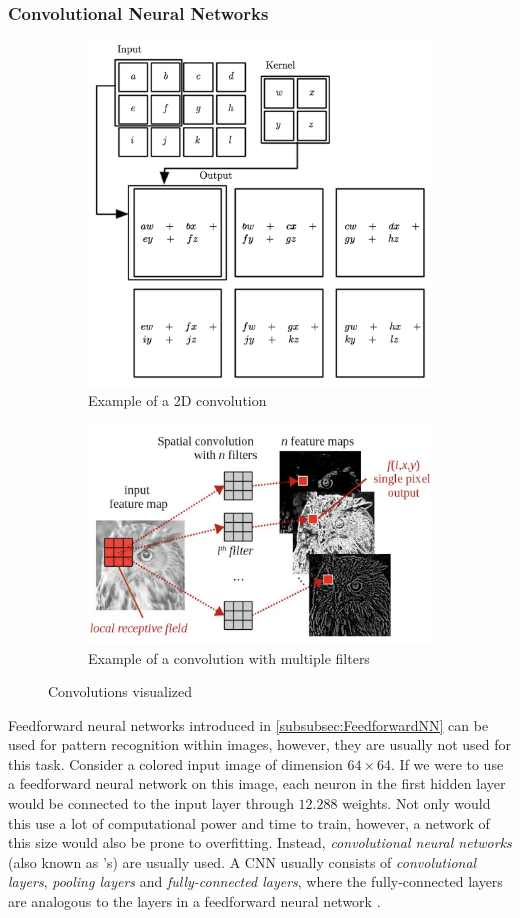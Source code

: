 \documentclass[./main.tex]{subfiles}
\begin{document}
\subsubsection{Convolutional Neural Networks} \label{subsubsec:CNN}
\begin{figure}[t]
    \centering
    \begin{subfigure}[t]{0.4\textwidth}
        \centering
        \includegraphics[height = 6 cm]{entities/2d_convolution_example.png}
        \caption{Example of a 2D convolution \cite{DeepLearning}}
    \end{subfigure}
    \begin{subfigure}[t]{0.4\textwidth}
        \centering
        \includegraphics[height = 5 cm]{entities/3d_convolution_example.png}
        \caption{Example of a convolution with multiple filters \cite{Everything}}
    \end{subfigure}
    \caption{Convolutions visualized}
    \label{fig:convolutionexample}
\end{figure}
Feedforward neural networks introduced in \ref{subsubsec:FeedforwardNN} can be used for pattern recognition within images, however, they are usually not used for this task. Consider a colored input image of dimension $64 \times 64$. If we were to use a feedforward neural network on this image, each neuron in the first hidden layer would be connected to the input layer through $12.288$ weights. Not only would this use a lot of computational power and time to train, however, a network of this size would also be prone to overfitting. Instead, \textit{convolutional neural networks} (also known as 's) are usually used. A CNN usually consists of \textit{convolutional layers}, \textit{pooling layers} and \textit{fully-connected layers}, where the fully-connected layers are analogous to the layers in a feedforward neural network \cite{CNN}.
\end{document}
